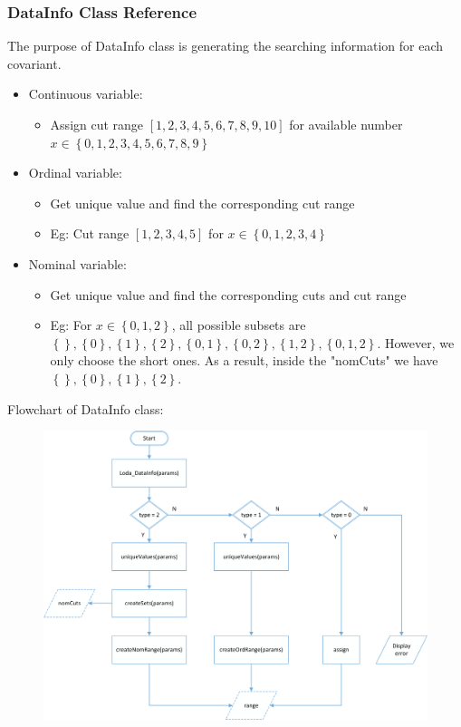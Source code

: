 \documentclass{article}
\begin{document}
\subsubsection{DataInfo Class Reference}
The purpose of DataInfo class is generating the searching information for each covariant.

\begin{itemize}
\item Continuous variable:
\begin{itemize}
\item Assign cut range $\left[1,2,3,4,5,6,7,8,9,10\right]$ for available number $x \in \left\{ {0,1,2,3,4,5,6,7,8,9} \right\}$
\end{itemize}
\item Ordinal variable:
\begin{itemize}
\item Get unique value and find the corresponding cut range
\item Eg: Cut range $\left[1,2,3,4,5\right]$ for $x \in \left\{ {0,1,2,3,4} \right\}$
\end{itemize}
\item Nominal variable:
\begin{itemize}
\item Get unique value and find the corresponding cuts and cut range 
\item Eg: For $x \in \left\{ {0,1,2} \right\}$, all possible subsets are $\left\{\right\},\left\{0\right\},\left\{1\right\},\left\{2\right\},\left\{0,1\right\},\left\{0,2\right\},\left\{1,2\right\},\left\{0,1,2\right\}$. However, we only choose the short ones. As a result, inside the "nomCuts" we have $\left\{\right\},\left\{0\right\},\left\{1\right\},\left\{2\right\}$.
\end{itemize}

\end{itemize}

Flowchart of DataInfo class:
\begin{figure}[H]
\centering
\includegraphics[width=1\textwidth]{DataInfo.png}
\end{figure}
\end{document}
